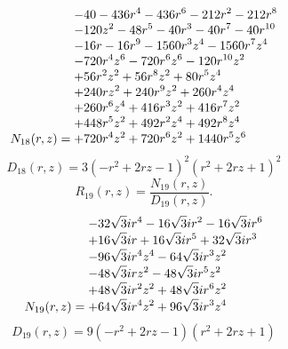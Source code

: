 \documentclass[11pt,a4paper]{article}
\begin{document}
\begin{equation}
N_{18}(r,z)=\shortstack[l]{$\displaystyle  - 40 - 436 r^{4} - 436 r^{6} - 212 r^{2} - 212 r^{8}$\\
$\displaystyle  - 120 z^{2} - 48 r^{5} - 40 r^{3} - 40 r^{7} - 40 r^{10}$\\
$\displaystyle  - 16 r - 16 r^{9} - 1560 r^{3} z^{4} - 1560 r^{7} z^{4}$\\
$\displaystyle  - 720 r^{4} z^{6} - 720 r^{6} z^{6} - 120 r^{10} z^{2}$\\
$\displaystyle  + 56 r^{2} z^{2} + 56 r^{8} z^{2} + 80 r^{5} z^{4}$\\
$\displaystyle  + 240 r z^{2} + 240 r^{9} z^{2} + 260 r^{4} z^{4}$\\
$\displaystyle  + 260 r^{6} z^{4} + 416 r^{3} z^{2} + 416 r^{7} z^{2}$\\
$\displaystyle  + 448 r^{5} z^{2} + 492 r^{2} z^{4} + 492 r^{8} z^{4}$\\
$\displaystyle  + 720 r^{4} z^{2} + 720 r^{6} z^{2} + 1440 r^{5} z^{6}$}
\label{eq:cat-numerator-18}
\end{equation}
\begin{equation}
D_{18}(r,z)=3 \left(- r^{2} + 2 r z - 1\right)^{2} \left(r^{2} + 2 r z + 1\right)^{2}
\label{eq:cat-denominator-18}
\end{equation}
\begin{equation}
R_{19}(r,z)=\frac{N_{19}(r,z)}{D_{19}(r,z)}.
\label{eq:cat-rational-19}
\end{equation}
\begin{equation}
N_{19}(r,z)=\shortstack[l]{$\displaystyle  - 32 \sqrt{3} i r^{4} - 16 \sqrt{3} i r^{2} - 16 \sqrt{3} i r^{6}$\\
$\displaystyle  + 16 \sqrt{3} i r + 16 \sqrt{3} i r^{5} + 32 \sqrt{3} i r^{3}$\\
$\displaystyle  - 96 \sqrt{3} i r^{4} z^{4} - 64 \sqrt{3} i r^{3} z^{2}$\\
$\displaystyle  - 48 \sqrt{3} i r z^{2} - 48 \sqrt{3} i r^{5} z^{2}$\\
$\displaystyle  + 48 \sqrt{3} i r^{2} z^{2} + 48 \sqrt{3} i r^{6} z^{2}$\\
$\displaystyle  + 64 \sqrt{3} i r^{4} z^{2} + 96 \sqrt{3} i r^{3} z^{4}$}
\label{eq:cat-numerator-19}
\end{equation}
\begin{equation}
D_{19}(r,z)=9 \left(- r^{2} + 2 r z - 1\right) \left(r^{2} + 2 r z + 1\right)
\label{eq:cat-denominator-19}
\end{equation}
\end{document}
